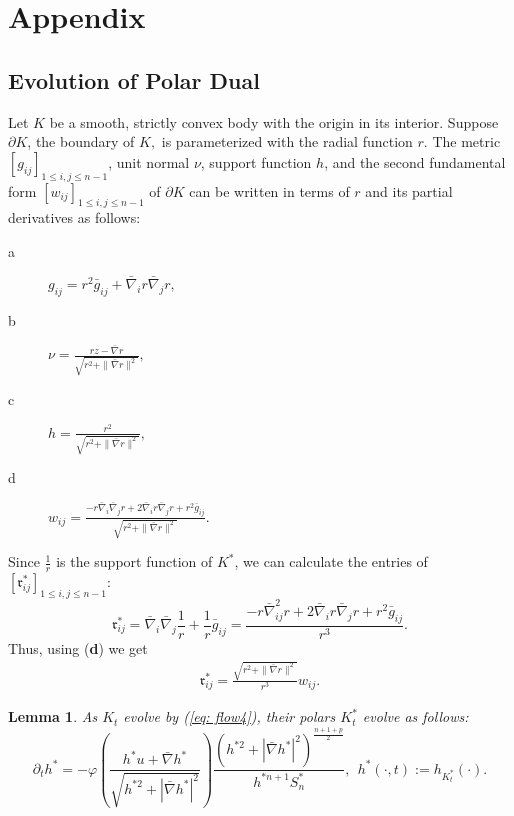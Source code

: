 \documentclass{amsart}
\newtheorem{lemma}[theorem]{Lemma}
\theoremstyle{definition}
\theoremstyle{remark}
\numberwithin{equation}{section}
\begin{document}
\section{Appendix}\label{appendix}

\subsection*{Evolution of Polar Dual}

Let $K$ be a smooth, strictly convex body with the origin in its interior. Suppose $\partial K$, the boundary of $K,$ is parameterized with the radial function $r.$
The metric $[g_{ij}]_{1\leq i,j\leq n-1}$, unit normal $\nu$, support function $h$, and the second fundamental form $[w_{ij}]_{1\leq i,j\leq n-1}$ of $\partial K$
can be written in terms of $r$ and its partial derivatives as follows:
\begin{description}
  \item[a] $ g_{ij}=r^2\bar{g}_{ij}+\bar{\nabla}_ir\bar{\nabla}_jr,$
  \item[b] $ \nu=\frac{r z-\bar{\nabla}r}{\sqrt{r^2+\|\bar{\nabla}r\|^2}},$
  \item[c] $ h=\frac{r^2}{\sqrt{r^2+\|\bar{\nabla}r\|^2}},$
  \item[d] $ w_{ij}=\frac{-r\bar{\nabla}_i\bar{\nabla}_jr+2\bar{\nabla}_ir\bar{\nabla}_jr+
  r^2\bar{g}_{ij}}{\sqrt{r^2+\|\bar{\nabla}r\|^2}}.$
\end{description}
Since $\frac{1}{r}$ is the support function of $K^{\ast}$, we can calculate the entries of $[\mathfrak{r}^{\ast}_{ij}]_{1\leq i,j\leq n-1}$:
\[\mathfrak{r}^{\ast}_{ij}=\bar{\nabla}_i\bar{\nabla}_j\frac{1}{r}+\frac{1}{r}\bar{g}_{ij}=
\frac{-r\bar{\nabla}^2_{ij}r+2\bar{\nabla}_ir\bar{\nabla}_jr+r^2\bar{g}_{ij}}{r^3}.\]
Thus, using (\textbf{d}) we get
\begin{align*}
\mathfrak{r}^{\ast}_{ij}=\frac{\sqrt{r^2+\|\bar{\nabla}r\|^2}}{r^3}w_{ij}.
\end{align*}
\begin{lemma}\label{app1}
As $K_t$ evolve by (\ref{eq: flow4}), their polars $K_t^{\ast}$ evolve as follows:
\[\partial_th^{\ast}=-\varphi\left(\frac{h^{\ast}u+\bar{\nabla} h^{\ast}}{\sqrt{h^{\ast2}+|\bar{\nabla} h^{\ast}|^2}}\right)\frac{(h^{\ast2}+|\bar{\nabla} h^{\ast}|^2)^{\frac{n+1+p}{2}}}{h^{\ast n+1}S_n^{\ast}},~~h^{\ast}(\cdot,t):=h_{K_t^{\ast}}(\cdot).\]
\end{lemma}
\end{document}
